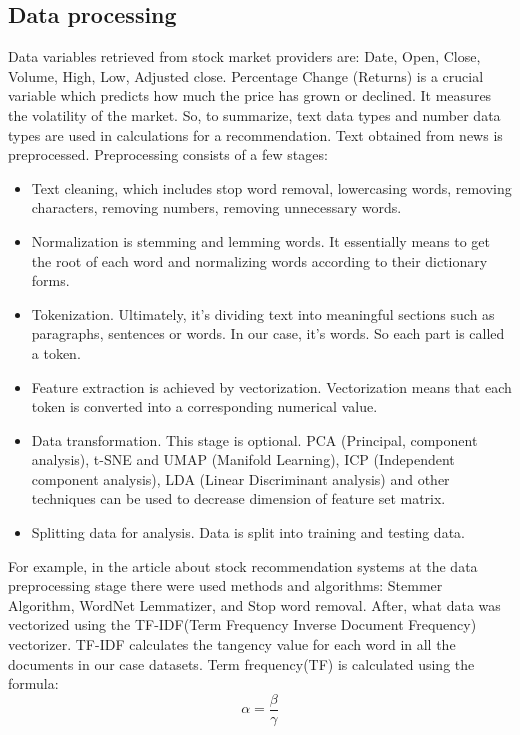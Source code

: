 \documentclass[10pt,twoside,english,a4paper]{article}
\begin{document}
\subsection{Data processing}
\par Data variables retrieved from stock market providers are: Date, Open, Close, Volume, High, Low, Adjusted close. Percentage Change (Returns) is a crucial variable which predicts how much the price has grown or declined. It measures the volatility of the market. So, to summarize, text data types and number data types are used in calculations for a recommendation. Text obtained from news is preprocessed. Preprocessing consists of a few stages:
\begin{itemize}
    \item Text cleaning, which includes stop word removal, lowercasing words, removing characters, removing numbers, removing unnecessary words.
    \item Normalization is stemming and lemming words. It essentially means to get the root of each word and normalizing words according to their dictionary forms.
    \item Tokenization. Ultimately, it's dividing text into meaningful sections such as paragraphs, sentences or words. In our case, it's words. So each part is called a token.
    \item Feature extraction is achieved by vectorization. Vectorization means that each token is converted into a corresponding numerical value. 
    \item Data transformation. This stage is optional. PCA (Principal, component analysis), t-SNE and UMAP (Manifold Learning), ICP (Independent component analysis), LDA (Linear Discriminant analysis) and other techniques can be used to decrease dimension of feature set matrix.\cite{dimens_red}
    \item Splitting data for analysis. Data is split into training and testing data.\cite{nlp_research1}\cite{nlp_research2}
\end{itemize}
For example, in the article about stock recommendation systems\cite{stock_rec} at the data preprocessing stage there were used methods and algorithms: Stemmer Algorithm, WordNet Lemmatizer, and Stop word removal. After, what data was vectorized using the TF-IDF(Term Frequency Inverse Document Frequency) vectorizer.\cite{stem_alg}\cite{lemm_alg} TF-IDF calculates the tangency value for each word in all the documents in our case datasets. 
Term frequency(TF) is calculated using the formula:
\[ \alpha = \frac{\beta}{\gamma}\]
\end{document}
